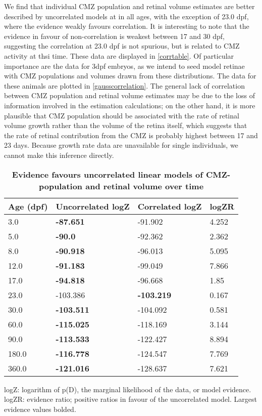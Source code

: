 We find that individual CMZ population and retinal volume estimates are better described by uncorrelated models at in all ages, with the exception of 23.0 dpf, where the evidence weakly favours correlation. It is interesting to note that the evidence in favour of non-correlation is weakest between 17 and 30 dpf, suggesting the correlation at 23.0 dpf is not spurious, but is related to CMZ activity at thsi time. These data are displayed in \autoref{corrtable}. Of particular importance are the data for 3dpf embryos, as we intend to seed model retinae with CMZ populations and volumes drawn from these distributions. The data for these animals are plotted in \autoref{gausscorrelation}. The general lack of correlation between CMZ population and retinal volume estimates may be due to the loss of information involved in the estimation calculations; on the other hand, it is more plausible that CMZ population should be associated with the rate of retinal volume growth rather than the volume of the retina itself, which suggests that the rate of retinal contribution from the CMZ is probably highest between 17 and 23 days. Because growth rate data are unavailable for single individuals, we cannot make this inference directly.

\begin{table}[!ht]
    \centering
    \caption{{\bf Evidence favours uncorrelated linear models of CMZ-population and retinal volume over time}}
    \begin{tabular}{|l|l|l|l|}
        \hline
        {\bf Age (dpf)} & {\bf Uncorrelated logZ} & {\bf Correlated logZ} & {\bf logZR}\\ \hline
        3.0 & {\bf -87.651} & -91.902 & 4.252\\ \hline
        5.0 & {\bf -90.0} & -92.362 & 2.362\\ \hline
        8.0 & {\bf -90.918} & -96.013 & 5.095\\ \hline
        12.0 & {\bf -91.183} & -99.049 & 7.866\\ \hline
        17.0 & {\bf -94.818} & -96.668 & 1.85\\ \hline
        23.0 & -103.386 & {\bf -103.219} & 0.167\\ \hline
        30.0 & {\bf -103.511} & -104.092 & 0.581\\ \hline
        60.0 & {\bf -115.025} & -118.169 & 3.144\\ \hline
        90.0 & {\bf -113.533} & -122.427 & 8.894\\ \hline
        180.0 & {\bf -116.778} & -124.547 & 7.769\\ \hline
        360.0 & {\bf -121.016} & -128.637 & 7.621\\ \hline
        \end{tabular}
    \begin{flushleft} logZ: logarithm of p(D), the marginal likelihood of the data, or model evidence. logZR: evidence ratio; positive ratios in favour of the uncorrelated model. Largest evidence values bolded.
    \end{flushleft}
    \label{corrtable}
\end{table}

